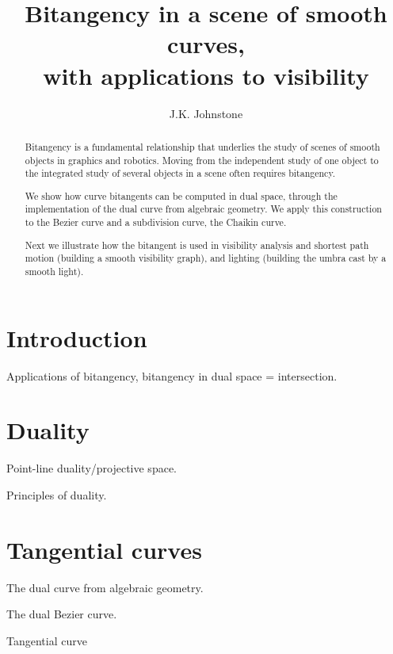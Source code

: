 \documentclass[12pt]{article}
\title{Bitangency in a scene of smooth curves,\\with applications to visibility}
\author{J.K. Johnstone}
\begin{document}
\maketitle


\begin{abstract}
Bitangency is a fundamental relationship that underlies the study
of scenes of smooth objects in graphics and robotics.
Moving from the independent study of one object to the 
integrated study of several objects in a scene often requires bitangency.

We show how curve bitangents can be computed in dual space, through the implementation
of the dual curve from algebraic geometry.
We apply this construction to the Bezier curve and a subdivision curve, the Chaikin curve.

Next we illustrate how the bitangent is used in visibility analysis
and shortest path motion (building a smooth visibility graph),
and lighting (building the umbra cast by a smooth light).
\end{abstract}


\clearpage

\section{Introduction}

Applications of bitangency, bitangency in dual space = intersection.

\clearpage

\section{Duality}

Point-line duality/projective space.

Principles of duality.

\clearpage

\section{Tangential curves}

The dual curve from algebraic geometry.

The dual Bezier curve.

\begin{defn2}
Tangential curve
\end{defn2}
\end{document}

